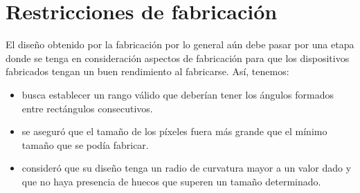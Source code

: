 \section{Restricciones de fabricación}

El diseño obtenido por la fabricación por lo general aún debe pasar por una etapa donde se tenga en consideración aspectos de fabricación para que los dispositivos fabricados tengan un buen rendimiento al fabricarse. Así, tenemos:

\begin{itemize}

  \item \cite{Prosopio-Galarza2019} busca establecer un rango válido que deberían tener los ángulos formados entre rectángulos consecutivos.

  \item \cite{Su2020} se aseguró que el tamaño de los píxeles fuera más grande que el mínimo tamaño que se podía fabricar.

  \item \cite{Piggott2017} consideró que su diseño tenga un radio de curvatura mayor a un valor dado y que no haya presencia de huecos que superen un tamaño determinado.

\end{itemize}


